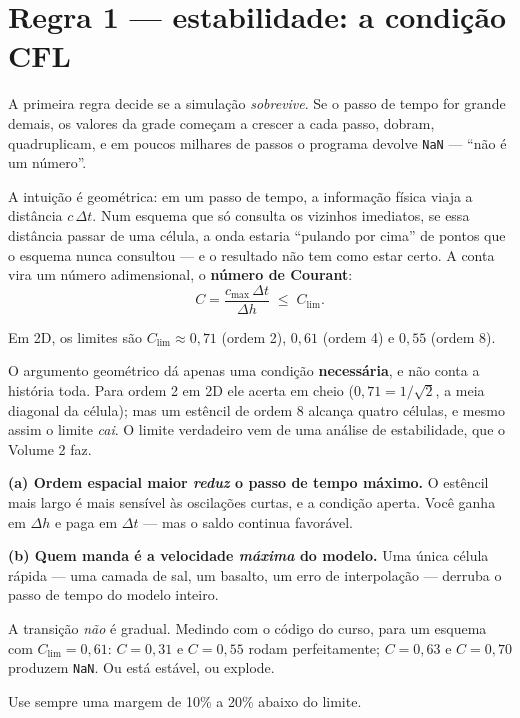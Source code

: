 \documentclass[11pt,a4paper,oneside]{report}
\begin{document}
\section{Regra 1 --- estabilidade: a condi\c{c}\~ao CFL}
\label{sec:cfl1v}

A primeira regra decide se a simula\c{c}\~ao \emph{sobrevive}. Se o passo de
tempo for grande demais, os valores da grade come\c{c}am a crescer a cada
passo, dobram, quadruplicam, e em poucos milhares de passos o programa
devolve \texttt{NaN} --- ``n\~ao \'e um n\'umero''.

A intui\c{c}\~ao \'e geom\'etrica: em um passo de tempo, a informa\c{c}\~ao
f\'isica viaja a dist\^ancia $c\,\Delta t$. Num esquema que s\'o consulta os
vizinhos imediatos, se essa dist\^ancia passar de uma c\'elula, a onda estaria
``pulando por cima'' de pontos que o esquema nunca consultou --- e o resultado
n\~ao tem como estar certo. A conta vira um n\'umero adimensional, o
\textbf{n\'umero de Courant}:
\begin{equation}
C = \frac{c_{\max}\,\Delta t}{\Delta h} \;\le\; C_{\lim}.
\label{eq:cfl1}
\end{equation}

Em 2D, os limites s\~ao $C_{\lim} \approx 0{,}71$ (ordem 2), $0{,}61$ (ordem
4) e $0{,}55$ (ordem 8).

O argumento geom\'etrico d\'a apenas uma condi\c{c}\~ao \textbf{necess\'aria},
e n\~ao conta a hist\'oria toda. Para ordem 2 em 2D ele acerta em cheio
($0{,}71 = 1/\sqrt{2}$, a meia diagonal da c\'elula); mas um est\^encil de
ordem 8 alcan\c{c}a quatro c\'elulas, e mesmo assim o limite \emph{cai}. O
limite verdadeiro vem de uma an\'alise de estabilidade, que o Volume 2 faz.

\begin{atencao}
\textbf{(a) Ordem espacial maior \emph{reduz} o passo de tempo m\'aximo.} O
est\^encil mais largo \'e mais sens\'ivel \`as oscila\c{c}\~oes curtas, e a
condi\c{c}\~ao aperta. Voc\^e ganha em $\Delta h$ e paga em $\Delta t$ ---
mas o saldo continua favor\'avel.

\textbf{(b) Quem manda \'e a velocidade \emph{m\'axima} do modelo.} Uma
\'unica c\'elula r\'apida --- uma camada de sal, um basalto, um erro de
interpola\c{c}\~ao --- derruba o passo de tempo do modelo inteiro.
\end{atencao}

\begin{armadilha}
A transi\c{c}\~ao \emph{n\~ao} \'e gradual. Medindo com o c\'odigo do curso,
para um esquema com $C_{\lim}=0{,}61$: $C = 0{,}31$ e $C = 0{,}55$ rodam
perfeitamente; $C = 0{,}63$ e $C = 0{,}70$ produzem \texttt{NaN}. Ou est\'a
est\'avel, ou explode.

Use sempre uma margem de 10\% a 20\% abaixo do limite.
\end{armadilha}
\end{document}
